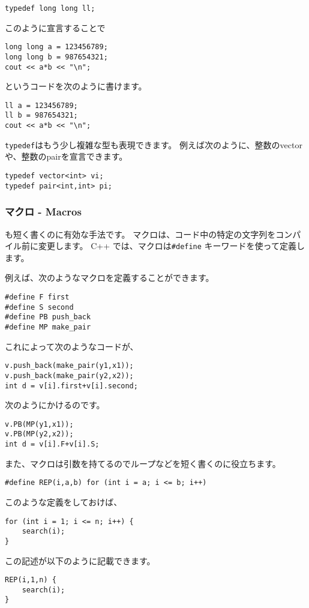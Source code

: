 \begin{lstlisting}
typedef long long ll;
\end{lstlisting}

このように宣言することで
\begin{lstlisting}
long long a = 123456789;
long long b = 987654321;
cout << a*b << "\n";
\end{lstlisting}
というコードを次のように書けます。
\begin{lstlisting}
ll a = 123456789;
ll b = 987654321;
cout << a*b << "\n";
\end{lstlisting}

\texttt{typedef}はもう少し複雑な型も表現できます。
例えば次のように、整数のvectorや、整数のpairを宣言できます。
\begin{lstlisting}
typedef vector<int> vi;
typedef pair<int,int> pi;
\end{lstlisting}

\subsubsection{マクロ -  Macros}

も短く書くのに有効な手法です。
マクロは、コード中の特定の文字列をコンパイル前に変更します。
C++ では、マクロは\texttt{\#define} キーワードを使って定義します。

例えば、次のようなマクロを定義することができます。
\begin{lstlisting}
#define F first
#define S second
#define PB push_back
#define MP make_pair
\end{lstlisting}

これによって次のようなコードが、
\begin{lstlisting}
v.push_back(make_pair(y1,x1));
v.push_back(make_pair(y2,x2));
int d = v[i].first+v[i].second;
\end{lstlisting}
次のようにかけるのです。
\begin{lstlisting}
v.PB(MP(y1,x1));
v.PB(MP(y2,x2));
int d = v[i].F+v[i].S;
\end{lstlisting}

また、マクロは引数を持てるのでループなどを短く書くのに役立ちます。

\begin{lstlisting}
#define REP(i,a,b) for (int i = a; i <= b; i++)
\end{lstlisting}
このような定義をしておけば、
\begin{lstlisting}
for (int i = 1; i <= n; i++) {
    search(i);
}
\end{lstlisting}
この記述が以下のように記載できます。
\begin{lstlisting}
REP(i,1,n) {
    search(i);
}
\end{lstlisting}

